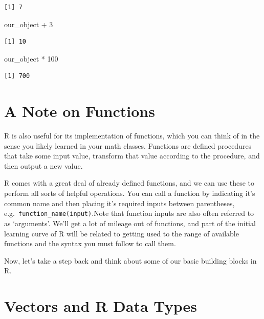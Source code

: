\documentclass[
  letterpaper,
  DIV=11,
  numbers=noendperiod]{scrreprt}
\newenvironment{Shaded}{\begin{snugshade}}{\end{snugshade}}
\newcommand{\DecValTok}[1]{\textcolor[rgb]{0.68,0.00,0.00}{#1}}
\newcommand{\NormalTok}[1]{\textcolor[rgb]{0.00,0.23,0.31}{#1}}
\newcommand{\SpecialCharTok}[1]{\textcolor[rgb]{0.37,0.37,0.37}{#1}}
\begin{document}
\begin{verbatim}
[1] 7
\end{verbatim}

\begin{Shaded}
\begin{Highlighting}[]
\NormalTok{our\_object }\SpecialCharTok{+} \DecValTok{3}
\end{Highlighting}
\end{Shaded}

\begin{verbatim}
[1] 10
\end{verbatim}

\begin{Shaded}
\begin{Highlighting}[]
\NormalTok{our\_object }\SpecialCharTok{*} \DecValTok{100}
\end{Highlighting}
\end{Shaded}

\begin{verbatim}
[1] 700
\end{verbatim}

\section{A Note on Functions}\label{a-note-on-functions}

R is also useful for its implementation of functions, which you can
think of in the sense you likely learned in your math classes. Functions
are defined procedures that take some input value, transform that value
according to the procedure, and then output a new value.

R comes with a great deal of already defined functions, and we can use
these to perform all sorts of helpful operations. You can call a
function by indicating it's common name and then placing it's required
inputs between parentheses, e.g.~\texttt{function\_name(input)}.Note
that function inputs are also often referred to as `arguments'. We'll
get a lot of mileage out of functions, and part of the initial learning
curve of R will be related to getting used to the range of available
functions and the syntax you must follow to call them.

Now, let's take a step back and think about some of our basic building
blocks in R.

\section{Vectors and R Data Types}\label{vectors-and-r-data-types}
\end{document}
